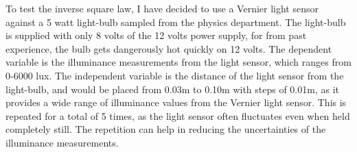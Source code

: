 \documentclass[a4paper,12pt]{article}
\begin{document}







To test the inverse square law, I have decided to use a Vernier light sensor against a 5 watt light-bulb sampled from the physics department. The light-bulb is supplied with only 8 volts of the 12 volts power supply, for from past experience, the bulb gets dangerously hot quickly on 12 volts. The dependent variable is the illuminance measurements from the light sensor, which ranges from 0-6000 lux. The independent variable is the distance of the light sensor from the light-bulb, and would be placed from 0.03m to 0.10m with steps of 0.01m, as it provides a wide range of illuminance values from the Vernier light sensor. This is repeated for a total of 5 times, as the light sensor often fluctuates even when held completely still. The repetition can help in reducing the uncertainties of the illuminance measurements.
\end{document}

